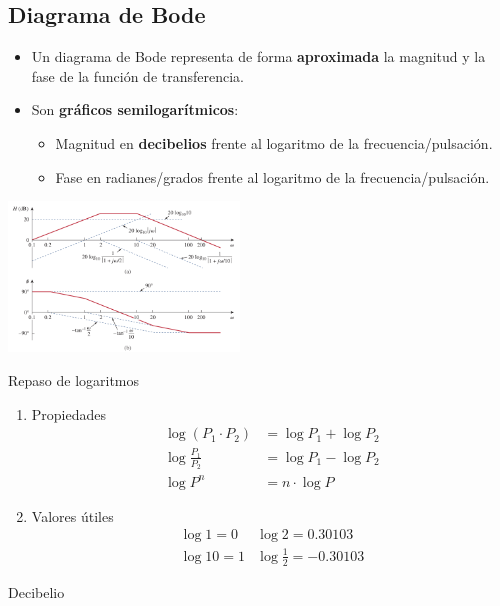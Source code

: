 \subsection{Diagrama de Bode}
\label{sec:org9b5c0f5}


\begin{itemize}
\item Un diagrama de Bode representa de forma \textbf{aproximada} la magnitud y la fase de la función de transferencia.
\item Son \textbf{gráficos semilogarítmicos}:
\begin{itemize}
\item Magnitud en \textbf{decibelios} frente al logaritmo de la frecuencia/pulsación.
\item Fase en radianes/grados frente al logaritmo de la frecuencia/pulsación.
\end{itemize}
\end{itemize}
\begin{center}
\includegraphics[height=4cm]{../figs/Bode.pdf}
\end{center}

{Repaso de logaritmos}

\begin{enumerate}
\item Propiedades
\label{sec:org9103f67}
\begin{align*}
  \log (P_1 \cdot P_2) &= \log P_1 + \log P_2\\
  \log \frac{P_1}{P_2} &= \log P_1 - \log P_2\\
  \log P^n &= n \cdot \log P
\end{align*}

\item Valores útiles
\label{sec:orge81bc9a}
\[
\begin{array}{ll}
  \log 1 = 0 & \log 2 = 0.30103\\
  \log 10 = 1 & \log \frac{1}{2} = -0.30103
\end{array}
\]
\end{enumerate}

{Decibelio}


